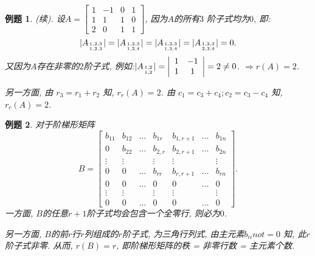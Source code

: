 \documentclass[a4paper]{book}
\newtheorem{eg}{例题}[chapter]
\begin{document}
\begin{eg}(续). 设$A=\begin{bmatrix}1&-1&0&1\\1&1&1&0\\2&0&1&1\end{bmatrix}$, 因为$A$的所有$3$ 阶子式均为$0$, 即:
\begin{displaymath}
|A_{1,2,3\atop 1,2,3}|=|A_{1,2,3\atop 1,2,4}|=|A_{1,2,3\atop 1,3,4}|=|A_{1,2,3\atop 2,3,4}|=0.\end{displaymath}
又因为$A$存在非零的$2$阶子式, 例如:$|A_{1,2\atop 1,2}|=\left|\begin{array}{cc}1&-1\\1&1\end{array}\right|=2\not=0$. $\Rightarrow r(A)=2$.

另一方面, 由 $r_3 = r_1+r_2$ 知, $r_r(A) = 2$. 由 $c_1 = c_3+c_4; c_2 = c_3-c_4$ 知, $r_c(A) = 2$.
\end{eg}

\begin{eg}
对于阶梯形矩阵
$$B=\begin{bmatrix}b_{11}&b_{12}&\dots &b_{1r}&b_{1,r+1}&\dots&b_{1n}\\ 0& b_{22}&\dots &b_{2,r}&b_{2,r+1}&\dots &b_{2n}\\ \vdots&\vdots&&\vdots&\vdots&&\vdots\\ 0&0&\dots&b_{rr}&b_{r,r+1}&\dots&b_{rn}\\ 0&0&\dots&0&0&\dots&0\\\vdots&\vdots&&\vdots&\vdots&&\vdots\\0&0&\dots&0&0&\dots&0
\end{bmatrix}.$$
一方面, $B$的任意$r+1$阶子式均会包含一个全零行, 则必为$0$.

另一方面, $B$的前$r$行$r$列组成的$r$阶子式, 为三角行列式, 由主元素$b_{ii}
not= 0$ 知, 此$r$ 阶子式非零.
 从而, $r(B) = r$, 即阶梯形矩阵的秩 = 非零行数 = 主元素个数.
\end{eg}
\end{document}
